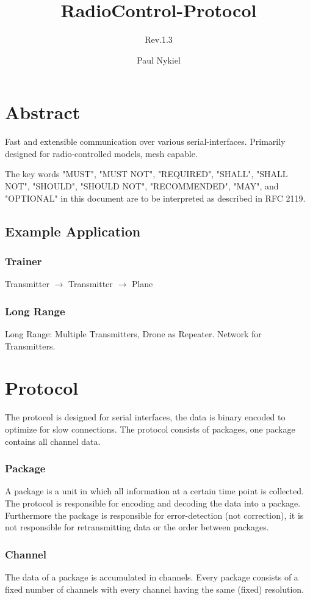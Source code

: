 \documentclass{scrreprt}
\title{RadioControl-Protocol}
\subtitle{Rev.1.3}
\author{Paul Nykiel}
\begin{document}
\maketitle
\tableofcontents

\pagebreak

\chapter{Abstract}
Fast and extensible communication over various serial-interfaces. Primarily
designed for radio-controlled models, mesh capable.

The key words "MUST", "MUST NOT", "REQUIRED", "SHALL", "SHALL
NOT", "SHOULD", "SHOULD NOT", "RECOMMENDED",  "MAY", and
"OPTIONAL" in this document are to be interpreted as described in
RFC 2119.

\section{Example Application}
\subsection{Trainer}
Transmitter $\to$ Transmitter $\to$ Plane
\subsection{Long Range}
Long Range: Multiple Transmitters, Drone as Repeater. Network for Transmitters.

\chapter{Protocol}
The protocol is designed for serial interfaces, the data is binary encoded to
optimize for slow connections. The protocol consists of packages, one package
contains all channel data.

\subsection{Package}
A package is a unit in which all information at a certain time point is collected.
The protocol is responsible for encoding and decoding the data into a package.
Furthermore the package is responsible for error-detection (not correction), it
is not responsible for retransmitting data or the order between packages.

\subsection{Channel}
The data of a package is accumulated in channels. Every package consists of a fixed
number of channels with every channel having the same (fixed) resolution.
\end{document}
